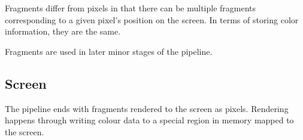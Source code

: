 Fragments differ from pixels in that there can be multiple fragments corresponding
to a given pixel's position on the screen. In terms of storing color information,
they are the same.

Fragments are used in later minor stages of the pipeline.

\subsection{Screen}
The pipeline ends with fragments rendered to the screen as pixels.
Rendering happens through writing colour data to a special region in memory
mapped to the screen.


